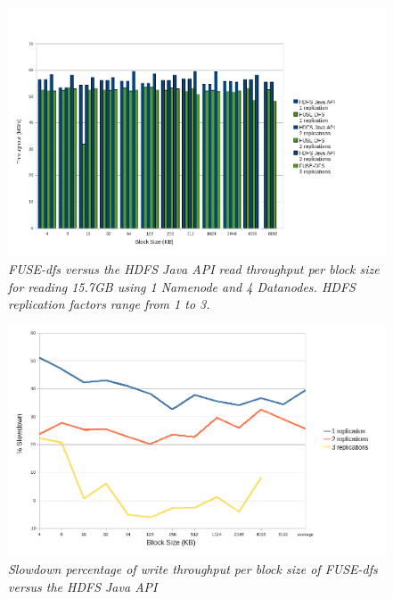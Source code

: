 \documentclass[11]{article}
\begin{document}
\begin{figure}
 \centering
 \includegraphics[totalheight=.25\textheight,
width=.75\textwidth,bb=0 0 985 682, scale=0.50]{images/ReadThroughput-4Datanodes-Bar.png}
 \caption{\emph{FUSE-dfs versus the HDFS Java API \textit{read} throughput per block size 
for reading 15.7GB using \textit{1 Namenode} and \textit{4 Datanodes}. HDFS replication factors range from 1 to 3.}}
\end{figure}

\begin{figure}
 \centering
 \includegraphics[totalheight=.25\textheight,
width=.75\textwidth,bb=0 0 985 682, scale=0.50]{images/WriteSlowdown-4Datanodes.png}
 \caption{\emph{Slowdown percentage of \textit{write} throughput per block size of FUSE-dfs versus the HDFS Java API}}
\end{figure}
\end{document}
